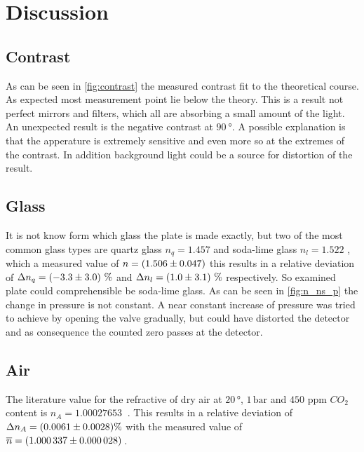\section{Discussion}
\label{sec:Diskussion}

\subsection{Contrast}

As can be seen in \autoref{fig:contrast} the measured contrast fit to the theoretical course.
As expected most measurement point lie below the theory. 
This is a result not perfect mirrors and filters, which all are absorbing a small amount of the light.
An unexpected result is the negative contrast at $\SI{90}{\degree}$.
A possible explanation is that the apperature is extremely sensitive and even more so at the extremes of the contrast.
In addition background light could be a source for distortion of the result.

\subsection{Glass}

It is not know form which glass the plate is made exactly, but two of the most common glass types are quartz glass $n_{q} = 1.457$\cite{Malitson:65} and soda-lime glass $n_{l} = 1.522$ \cite{RUBIN1985275},
which a measured value of $n = \SI{1.506 \pm 0.047}{}$ this results in a relative deviation of $\Delta n_q = \SI{-3.3 \pm 3.0} \,\%$ and
$\Delta n_l = \SI{1.0 \pm 3.1}\,\%$ respectively. 
So examined plate could comprehensible be soda-lime glass.
As can be seen in \autoref{fig:n_ns_p} the change in pressure is not constant. 
A near constant increase of pressure was tried to achieve by opening the valve gradually, but could have distorted the detector and as consequence the counted zero passes at the detector.

\subsection{Air}

The literature value for the refractive of dry air at $20\, \unit{\degree}$, $1\, \unit{\bar}$ and $450$ ppm $CO_{2}$ content is $n_{A} = \SI{1.00027653}{}$ \cite{Ciddor:96}.
This results in a relative deviation of  $\Delta n_{A} = \SI{0.0061 \pm 0.0028}{} \%$ with the measured value of $\overline{n} = \SI{1.000337 \pm 0.000028}{}\,$. 